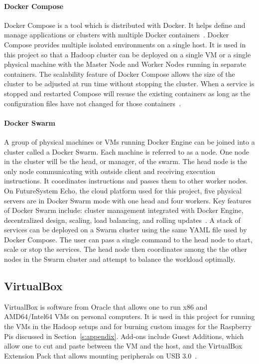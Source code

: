 \paragraph{Docker Compose} Docker Compose is a tool which is distributed
with Docker. It helps define and manage applications or clusters with
multiple Docker
containers~\cite{hid-sp18-405-docker-compose-doc}. Docker Compose
provides multiple isolated environments on a single host. It is used
in this project so that a Hadoop cluster can be deployed on a single
VM or a single physical machine with the Master Node and Worker Nodes
running in separate containers. The scalability feature of Docker
Compose allows the size of the cluster to be adjusted at run time
without stopping the cluster. When a service is stopped and restarted
Compose will resuse the existing containers as long as the
configuration files have not changed for those
containers~\cite{hid-sp18-405-docker-compose-doc}.

\paragraph{Docker Swarm} A group of physical machines or VMs running 
Docker Engine can be joined into a cluster called a Docker Swarm. Each
machine is referred to as a node. One node in the cluster will be the
head, or manager, of the swarm. The head node is the only node
communicating with outside client and receiving execution
instructions. It coordinates instructions and passes them to other
worker nodes. On FutureSystem Echo, the cloud platform used for this
project, five physical servers are in Docker Swarm mode with one head
and four workers. Key features of Docker Swarm include: cluster
management integrated with Docker Engine, decentralized design,
scaling, load balancing, and rolling
updates~\cite{hid-sp18-405-docker-swarm-doc}. A stack of services can
be deployed on a Swarm cluster using the same YAML file used by Docker
Compose. The user can pass a single command to the head node to start,
scale or stop the services. The head node then coordinates among the
the other nodes in the Swarm cluster and attempt to balance the
workload optimally.

\subsection{VirtualBox}
VirtualBox is software from Oracle that allows one to run x86 and
AMD64/Intel64 VMs on personal computers. It is used in this project
for running the VMs in the Hadoop setups and for burning custom images
for the Raspberry Pis discussed in Section~\ref{s:appendix}. Add-ons
include Guest Additions, which allow one to cut and paste between the
VM and the host, and the VirtualBox Extension Pack that allows
mounting peripherals on USB 3.0~\cite{hid-sp18-419-virtualbox}.

